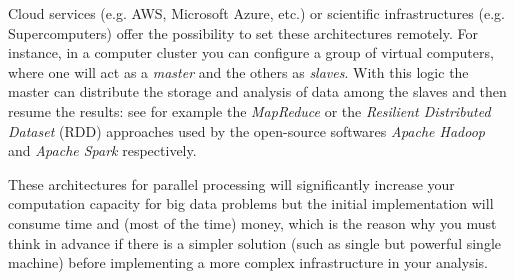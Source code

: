Cloud services (e.g. AWS, Microsoft Azure, etc.) or scientific infrastructures (e.g. Supercomputers) offer the possibility to set these architectures remotely. For instance, in a computer cluster you can configure a group of virtual computers, where one will act as a \textit{master} and the others as \textit{slaves}. With this logic the master can distribute the storage and analysis of data among the slaves and then resume the results: see for example the \textit{MapReduce} or the \textit{Resilient Distributed Dataset} (RDD) approaches used by the open-source softwares \textit{Apache Hadoop} and \textit{Apache Spark} respectively. 

These architectures for parallel processing will significantly increase your computation capacity for big data problems but the initial implementation will consume time and (most of the time) money, which is the reason why you must think in advance if there is a simpler solution (such as single but powerful single machine) before implementing a more complex infrastructure in your analysis.